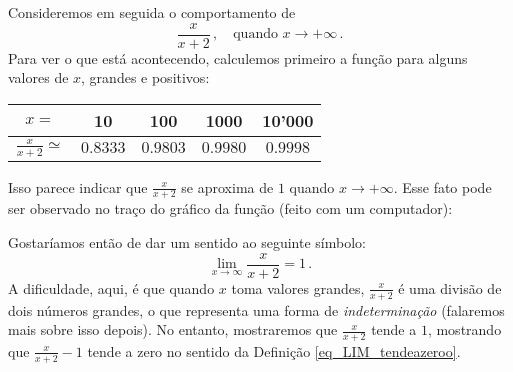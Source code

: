 \begin{ex}\label{Ex:razaomuitosimples}
Consideremos em seguida o comportamento de
$$\frac{x}{x+2}\,,\quad \text{quando $x\to + \infty$}\,.$$
Para ver o que está acontecendo, 
calculemos primeiro a função para alguns valores de $x$, grandes e
positivos:
\begin{center}
\begin{tabular}{c|c|c|c|c}
$x=$&10&100&1000&10'000\\
\hline
$\frac{x}{x+2}\simeq $&$0.8333$&$0.9803$&$0.9980$&$0.9998$
\end{tabular}
\end{center}
Isso parece indicar que $\frac{x}{x+2}$ se
aproxima de $1$ quando $x\to+\infty$. 
Esse fato pode ser observado no traço do gráfico da função (feito com um
computador):

\begin{center}
\begin{bmlimage}\end{bmlimage}
\end{center}

Gostaríamos então de dar um sentido ao seguinte símbolo:
\begin{equation}\label{eq_ftendeaUM}
\lim_{x\to \infty}\frac{x}{x+2}=1\,.
\end{equation}
A dificuldade, aqui, é que quando $x$ toma valores grandes, $\frac{x}{x+2}$
é uma divisão de dois números grandes, o que representa uma forma de
\emph{indeterminação} (falaremos mais sobre isso depois). 
 No entanto, mostraremos que $\frac{x}{x+2}$ tende a $1$,
mostrando que $\frac{x}{x+2}-1$ tende a zero no sentido da Definição
\ref{eq_LIM_tendeazeroo}.


\end{ex}

